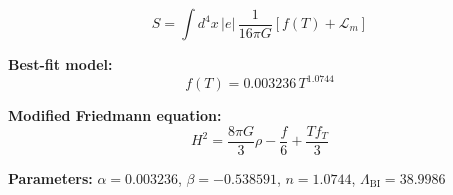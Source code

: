 
\begin{equation}
  S = \int d^4x \, |e| \, \frac{1}{16\pi G} \left[ f(T) + \mathcal{L}_m \right]
\end{equation}

\textbf{Best-fit model:}
\begin{equation}
  f(T) = 0.003236 \, T^{1.0744}
\end{equation}

\textbf{Modified Friedmann equation:}
\begin{equation}
  H^2 = \frac{8\pi G}{3} \rho - \frac{f}{6} + \frac{T f_T}{3}
\end{equation}

\textbf{Parameters:}
$\alpha = 0.003236$, \quad
$\beta = -0.538591$, \quad
$n = 1.0744$, \quad
$\Lambda_{\text{BI}} = 38.9986$